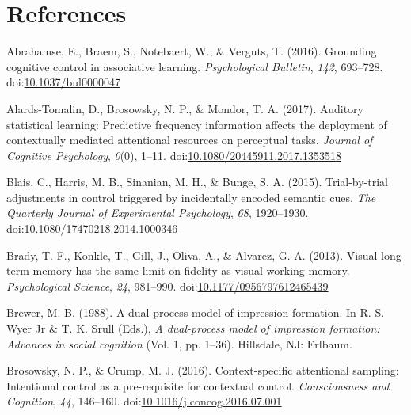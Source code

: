 \documentclass[english,,man,floatsintext]{apa6}
\begin{document}
\newpage

\section{References}\label{references}

\begingroup
\setlength{\parindent}{-0.5in} \setlength{\leftskip}{0.5in}

\hypertarget{refs}{}
\hypertarget{ref-abrahamse_grounding_2016}{}
Abrahamse, E., Braem, S., Notebaert, W., \& Verguts, T. (2016).
Grounding cognitive control in associative learning. \emph{Psychological
Bulletin}, \emph{142}, 693--728.
doi:\href{https://doi.org/10.1037/bul0000047}{10.1037/bul0000047}

\hypertarget{ref-alards-tomalin_auditory_2017}{}
Alards-Tomalin, D., Brosowsky, N. P., \& Mondor, T. A. (2017). Auditory
statistical learning: Predictive frequency information affects the
deployment of contextually mediated attentional resources on perceptual
tasks. \emph{Journal of Cognitive Psychology}, \emph{0}(0), 1--11.
doi:\href{https://doi.org/10.1080/20445911.2017.1353518}{10.1080/20445911.2017.1353518}

\hypertarget{ref-blais_trial-by-trial_2015}{}
Blais, C., Harris, M. B., Sinanian, M. H., \& Bunge, S. A. (2015).
Trial-by-trial adjustments in control triggered by incidentally encoded
semantic cues. \emph{The Quarterly Journal of Experimental Psychology},
\emph{68}, 1920--1930.
doi:\href{https://doi.org/10.1080/17470218.2014.1000346}{10.1080/17470218.2014.1000346}

\hypertarget{ref-brady_visual_2013}{}
Brady, T. F., Konkle, T., Gill, J., Oliva, A., \& Alvarez, G. A. (2013).
Visual long-term memory has the same limit on fidelity as visual working
memory. \emph{Psychological Science}, \emph{24}, 981--990.
doi:\href{https://doi.org/10.1177/0956797612465439}{10.1177/0956797612465439}

\hypertarget{ref-brewer_dual_1988}{}
Brewer, M. B. (1988). A dual process model of impression formation. In
R. S. Wyer Jr \& T. K. Srull (Eds.), \emph{A dual-process model of
impression formation: Advances in social cognition} (Vol. 1, pp. 1--36).
Hillsdale, NJ: Erlbaum.

\hypertarget{ref-brosowsky_context-specific_2016}{}
Brosowsky, N. P., \& Crump, M. J. (2016). Context-specific attentional
sampling: Intentional control as a pre-requisite for contextual control.
\emph{Consciousness and Cognition}, \emph{44}, 146--160.
doi:\href{https://doi.org/10.1016/j.concog.2016.07.001}{10.1016/j.concog.2016.07.001}
\end{document}
